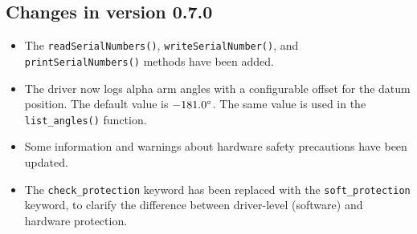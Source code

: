 \documentclass[11pt,a4paper]{scrartcl}
\begin{document}
\subsection*{Changes in version 0.7.0}
\begin{itemize}
\item The \texttt{readSerialNumbers()}, \texttt{writeSerialNumber()},
  and \texttt{printSerialNumbers()} methods have been added.
  
\item The driver now logs alpha arm angles with a configurable offset
  for the datum position. The default value is $-181.0\degree$.
  The same value is used in the \texttt{list\_angles()} function.
  
\item Some information and warnings about hardware safety precautions
  have been updated.
  
\item The \texttt{check\_protection} keyword has been replaced
  with the \texttt{soft\_protection} keyword, to clarify
  the difference between driver-level (software) and
  hardware protection.
\end{itemize}
\end{document}
